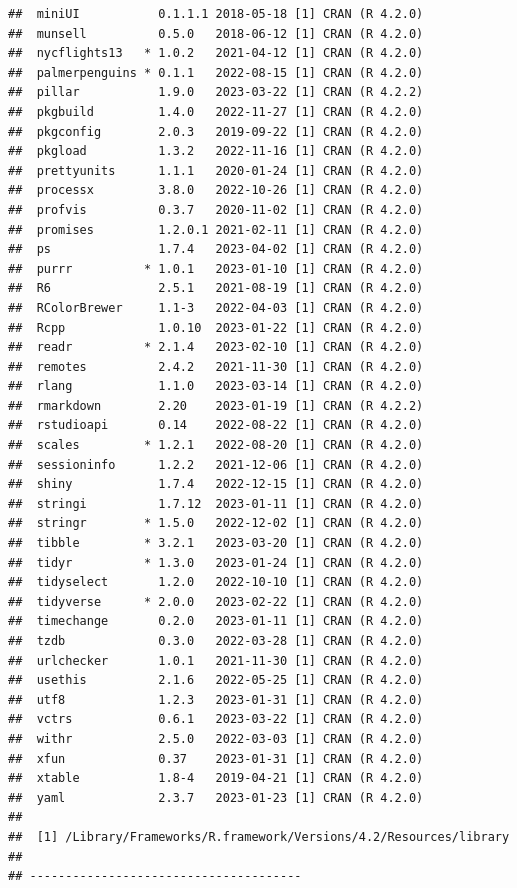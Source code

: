 \documentclass[print]{nuthesis}
\begin{document}
\begin{verbatim}
##  miniUI           0.1.1.1 2018-05-18 [1] CRAN (R 4.2.0)
##  munsell          0.5.0   2018-06-12 [1] CRAN (R 4.2.0)
##  nycflights13   * 1.0.2   2021-04-12 [1] CRAN (R 4.2.0)
##  palmerpenguins * 0.1.1   2022-08-15 [1] CRAN (R 4.2.0)
##  pillar           1.9.0   2023-03-22 [1] CRAN (R 4.2.2)
##  pkgbuild         1.4.0   2022-11-27 [1] CRAN (R 4.2.0)
##  pkgconfig        2.0.3   2019-09-22 [1] CRAN (R 4.2.0)
##  pkgload          1.3.2   2022-11-16 [1] CRAN (R 4.2.0)
##  prettyunits      1.1.1   2020-01-24 [1] CRAN (R 4.2.0)
##  processx         3.8.0   2022-10-26 [1] CRAN (R 4.2.0)
##  profvis          0.3.7   2020-11-02 [1] CRAN (R 4.2.0)
##  promises         1.2.0.1 2021-02-11 [1] CRAN (R 4.2.0)
##  ps               1.7.4   2023-04-02 [1] CRAN (R 4.2.0)
##  purrr          * 1.0.1   2023-01-10 [1] CRAN (R 4.2.0)
##  R6               2.5.1   2021-08-19 [1] CRAN (R 4.2.0)
##  RColorBrewer     1.1-3   2022-04-03 [1] CRAN (R 4.2.0)
##  Rcpp             1.0.10  2023-01-22 [1] CRAN (R 4.2.0)
##  readr          * 2.1.4   2023-02-10 [1] CRAN (R 4.2.0)
##  remotes          2.4.2   2021-11-30 [1] CRAN (R 4.2.0)
##  rlang            1.1.0   2023-03-14 [1] CRAN (R 4.2.0)
##  rmarkdown        2.20    2023-01-19 [1] CRAN (R 4.2.2)
##  rstudioapi       0.14    2022-08-22 [1] CRAN (R 4.2.0)
##  scales         * 1.2.1   2022-08-20 [1] CRAN (R 4.2.0)
##  sessioninfo      1.2.2   2021-12-06 [1] CRAN (R 4.2.0)
##  shiny            1.7.4   2022-12-15 [1] CRAN (R 4.2.0)
##  stringi          1.7.12  2023-01-11 [1] CRAN (R 4.2.0)
##  stringr        * 1.5.0   2022-12-02 [1] CRAN (R 4.2.0)
##  tibble         * 3.2.1   2023-03-20 [1] CRAN (R 4.2.0)
##  tidyr          * 1.3.0   2023-01-24 [1] CRAN (R 4.2.0)
##  tidyselect       1.2.0   2022-10-10 [1] CRAN (R 4.2.0)
##  tidyverse      * 2.0.0   2023-02-22 [1] CRAN (R 4.2.0)
##  timechange       0.2.0   2023-01-11 [1] CRAN (R 4.2.0)
##  tzdb             0.3.0   2022-03-28 [1] CRAN (R 4.2.0)
##  urlchecker       1.0.1   2021-11-30 [1] CRAN (R 4.2.0)
##  usethis          2.1.6   2022-05-25 [1] CRAN (R 4.2.0)
##  utf8             1.2.3   2023-01-31 [1] CRAN (R 4.2.0)
##  vctrs            0.6.1   2023-03-22 [1] CRAN (R 4.2.0)
##  withr            2.5.0   2022-03-03 [1] CRAN (R 4.2.0)
##  xfun             0.37    2023-01-31 [1] CRAN (R 4.2.0)
##  xtable           1.8-4   2019-04-21 [1] CRAN (R 4.2.0)
##  yaml             2.3.7   2023-01-23 [1] CRAN (R 4.2.0)
## 
##  [1] /Library/Frameworks/R.framework/Versions/4.2/Resources/library
## 
## --------------------------------------
\end{verbatim}
\end{document}
